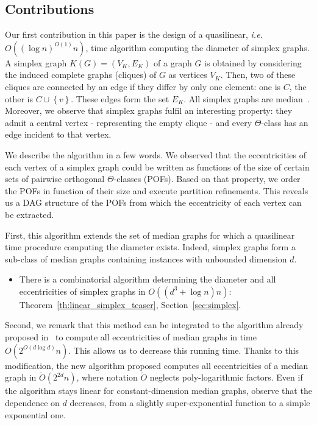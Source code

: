 \documentclass[a4paper,UKenglish,numberwithinsect,cleveref, autoref,anonymous]{lipics-v2021}
\newcommand{\set}[1]{\left\{ #1 \right\}}
\begin{document}
\subsection{Contributions}

Our first contribution in this paper is the design of a quasilinear, {\em i.e.} $O((\log n)^{O(1)}n)$, time algorithm computing the diameter of simplex graphs. A simplex graph $K(G) = (V_K,E_K)$ of a graph $G$ is obtained by considering the induced complete graphs (cliques) of $G$ as vertices $V_K$. Then, two of these cliques are connected by an edge if they differ by only one element: one is $C$, the other is $C \cup \set{v}$. These edges form the set $E_K$. All simplex graphs are median~\cite{BaCh08,BaLeMo86}. Moreover, we observe that simplex graphs fulfil an interesting property: they admit a central vertex - representing the empty clique - and every $\Theta$-class has an edge incident to that vertex.

We describe the algorithm in a few words. We observed that the eccentricities of each vertex of a simplex graph could be written as functions of the size of certain sets of pairwise orthogonal $\Theta$-classes (POFs). Based on that property, we order the POFs in function of their size and execute partition refinements. This reveals us a DAG structure of the POFs from which the eccentricity of each vertex can be extracted. 

First, this algorithm extends the set of median graphs for which a quasilinear time procedure computing the diameter exists. Indeed, simplex graphs form a sub-class of median graphs containing instances with unbounded dimension $d$.

\begin{itemize}
    \item There is a combinatorial algorithm determining the diameter and all eccentricities of simplex graphs in $O((d^3+\log n)n)$: Theorem~\ref{th:linear_simplex_teaser}, Section~\ref{sec:simplex}.
\end{itemize}

Second, we remark that this method can be integrated to the algorithm already proposed in~\cite{BeHa21} to compute all eccentricities of median graphs in time $O(2^{O(d\log d)}n)$. This allows us to decrease this running time. Thanks to this modification, the new algorithm proposed computes all eccentricities of a median graph in $\tilde{O}(2^{2d}n)$, where notation $\tilde{O}$ neglects poly-logarithmic factors. Even if the algorithm stays linear for constant-dimension median graphs, observe that the dependence on $d$ decreases, from a slightly super-exponential function to a simple exponential one.
\end{document}
